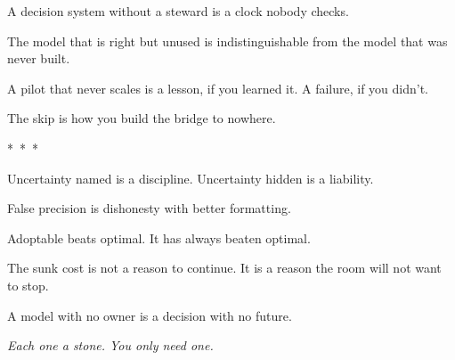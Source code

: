 A decision system without a steward is a clock nobody checks.


The model that is right but unused is indistinguishable from the model that was never built.


A pilot that never scales is a lesson, if you learned it. A failure, if you didn't.


The skip is how you build the bridge to nowhere.

\vspace{1.5em}
\begin{center}
  *~*~*
\end{center}
\vspace{1.5em}


Uncertainty named is a discipline. Uncertainty hidden is a liability.


False precision is dishonesty with better formatting.


Adoptable beats optimal. It has always beaten optimal.


The sunk cost is not a reason to continue. It is a reason the room will not want to stop.


A model with no owner is a decision with no future.

\vspace{2em}
\begin{center}
  \itshape Each one a stone. You only need one.
\end{center}
